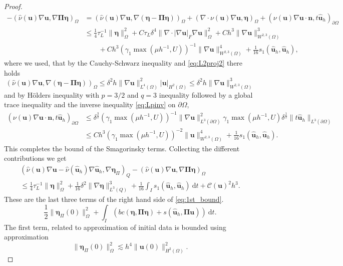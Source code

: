 \documentclass[10pt]{amsart}
\numberwithin{equation}{section}
\theoremstyle{definition}
\theoremstyle{remark}
\renewcommand{\(}{\bigl(}
\renewcommand{\)}{\bigr)}
\newcommand{\bld}[1]{\boldsymbol{#1}}
\newcommand{\bn}{\bld{n}}
\newcommand{\bu}{\bld{u}}
\newcommand{\bhu}{\hat{\bld{u}}}
\newcommand{\bldeta}{\bld{\eta}}
\newcommand{\bPi}{\bld{\Pi}}
\begin{document}
\begin{proof}
\begin{align*}
- (\hat \nu(\bu) \nabla \bu, \nabla
\bPi \bldeta)_\Omega &= (\hat \nu(\bu) \nabla \bu, \nabla(\bldeta-
\bPi \bldeta))_\Omega+  (\nabla \cdot \nu(\bu) \nabla \bu,
\bldeta)_\Omega +   (\nu(\bu) \nabla \bu \cdot \bn,
t \bhu_h)_{\partial \Omega}  
\\
&\leq \frac14 \tau_L^{-1} \|\bldeta\|_\Omega^2 + C \tau_L \delta^4
\|\nabla \cdot |\nabla \bu|_F \nabla \bu\|_\Omega^2 
+Ch^3 \|\nabla \bu\|_{W^{2,3}(\Omega)}^3 
\\
&\qquad 
+ Ch^3 (\gamma_1 \max( \mu h^{-1} ,
U))^{-1}  \|\nabla \bu\|_{W^{2,3}(\Omega)}^4 + \frac{1}{16} s_1(\bhu_h,\bhu_h),
\end{align*}
where we used, that by the Cauchy-Schwarz inequality and \eqref{eq:L2proj2}
there holds
\[
 (\hat \nu(\bu) \nabla \bu, \nabla(\bldeta-
\bPi \bldeta))_\Omega \leq \delta^2 h \|\nabla
\bu\|^2_{L^4(\Omega)}|\bu|_{H^2(\Omega)} \leq \delta^2 h \|\nabla \bu\|_{W^{2,3}(\Omega)}^3 
\]
and by H\"olders inequality with $p=3/2$ and $q=3$ inequality followed
by a global trace inequality and the inverse inequality
\eqref{eq:Lpinv} on $\partial \Omega$,
\begin{align*}
(\nu(\bu) \nabla \bu \cdot \bn,
t \bhu_h)_{\partial \Omega} 
& \leq \delta^{\frac32} (\gamma_1 \max( \mu h^{-1} ,
U))^{-1}  \|\nabla \bu\|^2_{L^3(\partial \Omega)}\gamma_1
\max(\mu h^{-1} , U) \delta^{\frac12} \|t \bhu_h\|_{L^3(\partial \Omega)}
\\
&\leq C h^3 (\gamma_1 \max( \mu h^{-1} ,
U))^{-2}  \|\bu\|_{W^{2,3}(\Omega)}^4 + \frac{1}{16} s_1(\bhu_h,\bhu_h).
\end{align*}
%
This completes the bound of the Smagorinsky terms. Collecting the
different contributions we get
\begin{multline}\label{eq:smag_bound}
(\hat \nu(\bu) \nabla \bu - \hat \nu(\bhu_h)
\nabla \bhu_h, \nabla \bldeta_\Pi)_Q - (\hat \nu(\bu) \nabla \bu, \nabla
\bPi \bldeta)_\Omega\\
\leq \frac14 \tau_L^{-1} \|\bldeta\|_\Omega^2 + \frac{1}{16} \delta^2
\|\nabla \bldeta\|_{L^3(Q)}^3 
+ \frac{1}{16}
\int_I s_1(\bhu_h,\bhu_h) ~\mbox{d}t + \mathcal{C}(\bu)^2 h^3.
\end{multline}
These are the last three terms of the right hand side of \eqref{eq:1st_bound}.
\[
\frac12\|\bldeta_{\Pi}(0)\|_\Omega^2 +  \int_I (bc(\bldeta,\bPi \bldeta)+ s(\bhu_h,\bPi \bu)) ~\mbox{d}t.
\]
The first term, related to approximation of initial data is bounded
using approximation
\[
\|\bldeta_{\Pi}(0)\|_\Omega^2 \lesssim h^4 \|\bu(0)\|_{H^2(\Omega)}^2.
\]
\end{proof}
\end{document}
